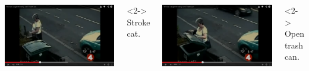 \documentclass{beamer}
\begin{document}
\begin{frame}
\begin{columns}[t]
            \includegraphics[width=\linewidth]{images/stroke3}\\
            \begin{visibleenv}<2->
            \tiny Stroke cat.
            \end{visibleenv}

            \includegraphics[width=\linewidth]{images/open_trash_can}\\
            \begin{visibleenv}<2->
                \tiny{Open trash can.}
            \end{visibleenv}


\end{columns}
\end{frame}
\end{document}
